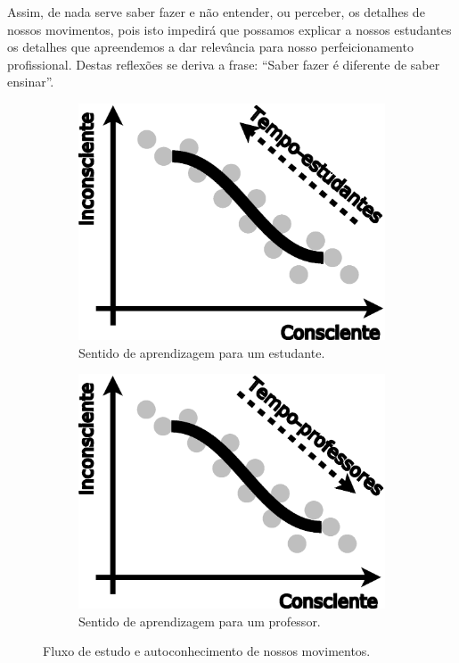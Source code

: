 Assim, de nada serve saber fazer e não entender, ou perceber, os detalhes de nossos movimentos,
pois isto impedirá que possamos explicar a nossos estudantes os detalhes que apreendemos 
a dar relevância para nosso perfeicionamento profissional.
Destas reflexões se deriva a frase: ``Saber fazer é diferente de saber ensinar''.
\begin{figure}[ht]
\centering
    \begin{subfigure}{.32\textwidth}
      \centering
      \includegraphics[width=.975\linewidth]{chapters/cap-musicalidade-tecnica/tecnica-emotion-5a}  
      \caption{Sentido de aprendizagem para um estudante.}
      \label{fig:tecnica-emotion-5:a}
    \end{subfigure}
    \qquad
    \begin{subfigure}{.32\textwidth}
      \centering
      \includegraphics[width=.975\linewidth]{chapters/cap-musicalidade-tecnica/tecnica-emotion-5b}  
      \caption{Sentido de aprendizagem para um professor.}
      \label{fig:tecnica-emotion-5:b}
    \end{subfigure}
    \caption{Fluxo de estudo e autoconhecimento de nossos movimentos.}
    \label{fig:tecnica-emotion-5}
\end{figure}



